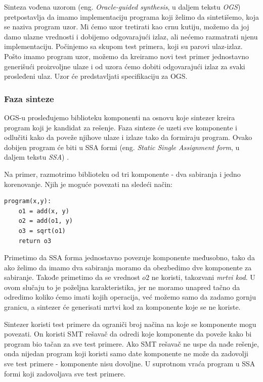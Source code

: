 Sinteza vođena uzorom (eng. \emph{Oracle-guided synthesis}, u daljem tekstu \emph{OGS}) \cite{PSE} pretpostavlja da imamo implementaciju programa koji želimo da sintetišemo, koja se naziva program uzor. Mi ćemo uzor tretirati kao crnu kutiju, možemo da joj damo ulazne vrednosti i dobijemo odgovarajući izlaz, ali nećemo razmatrati njenu implementaciju. Počinjemo sa skupom test primera, koji su parovi ulaz-izlaz. Pošto imamo program uzor, možemo da kreiramo novi test primer jednostavno generišući proizvoljne ulaze i od uzora ćemo dobiti odgovarajući izlaz za svaki prosleđeni ulaz. Uzor će predstavljati specifikaciju za OGS.


\subsubsection*{Faza sinteze}

OGS-u prosleđujemo biblioteku komponenti na osnovu koje sintezer kreira program koji je kandidat za rešenje. Faza sinteze će uzeti sve komponente i odlučiti kako da poveže njihove ulaze i izlaze tako da formiraju program. Ovako dobijen program će biti u SSA formi (eng. \emph{Static Single Assignment form}, u daljem tekstu \emph{SSA}) \cite{SSA}.

Na primer, razmotrimo biblioteku od tri komponente - dva sabiranja i jedno korenovanje. Njih je moguće povezati na sledeći način:

\begin{lstlisting}
program(x,y):
	o1 = add(x, y)
	o2 = add(o1, y)
	o3 = sqrt(o1)
	return o3
\end{lstlisting}

Primetimo da SSA forma jednostavno povezuje komponente me\-đu\-so\-bno, tako da ako želimo da imamo dva sabiranja moramo da obezbedimo dve komponente za sabiranje. Takođe primetimo da se vrednost $o2$ ne koristi, takozvani \emph{mrtvi kod}. U ovom slučaju to je poželjna karakteristika, jer ne moramo unapred tačno da odredimo koliko ćemo imati kojih operacija, već možemo samo da zadamo gornju granicu, a sintezer će generisati mrtvi kod za komponente koje se ne koriste.

Sintezer koristi test primere da ograniči broj načina na koje se komponente mogu povezati. On koristi SMT rešavač da odredi koje komponente da poveže kako bi program bio tačan za sve test primere. Ako SMT rešavač ne uspe da nađe rešenje, onda nijedan program koji koristi samo date komponente ne može da zadovolji sve test primere - komponente nisu dovoljne. U suprotnom vraća program u SSA formi koji zadovoljava sve test primere.


